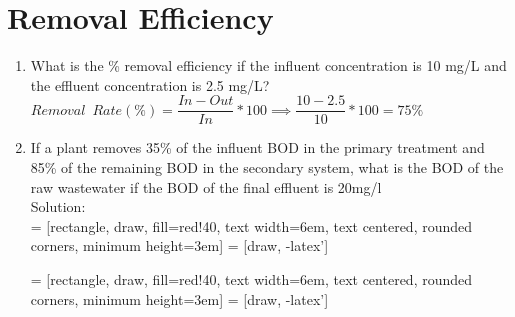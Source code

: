 \section{Removal Efficiency}
\begin{enumerate}

\item What is the \% removal efficiency if the influent concentration is 10 mg/L and the effluent concentration is 2.5 mg/L?\\
$Removal \enspace Rate (\%) = \dfrac{In-Out}{In}*100 \implies \dfrac{10-2.5}{10}*100=\boxed{75\%}$

\item If a plant removes 35\% of the influent BOD in the primary treatment and 85\% of the remaining BOD in the secondary system, what is the BOD of the raw wastewater if the BOD of the final effluent is 20mg/l \\
Solution:\\
 = [rectangle, draw, fill=red!40, 
    text width=6em, text centered, rounded corners, minimum height=3em]
 = [draw, -latex']
\begin{figure}[!h]
\centering
{}
\end{figure}

 = [rectangle, draw, fill=red!40, 
    text width=6em, text centered, rounded corners, minimum height=3em]
 = [draw, -latex']
\begin{figure}[!h]
\centering
{}
\end{figure}
\end{enumerate}
